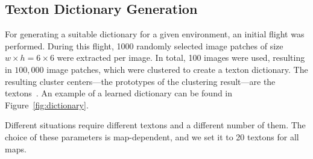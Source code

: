 \subsection{Texton Dictionary Generation}
\label{sec:text-dict-gener}

For generating a suitable dictionary for a given environment, an
initial flight was performed. During this flight, 1000 randomly
selected image patches of size $w \times h = 6 \times 6$ were
extracted per image. In total, 100 images were used, resulting in
$100,000$ image patches, which were clustered to create a texton
dictionary. The resulting cluster centers---the prototypes of the
clustering result---are the textons~\cite{varma2003texture}. An
example of a learned dictionary can be found in
Figure~\ref{fig:dictionary}.

Different situations require different textons and a different number
of them. The choice of these parameters is map-dependent, and we set
it to 20 textons for all maps.


